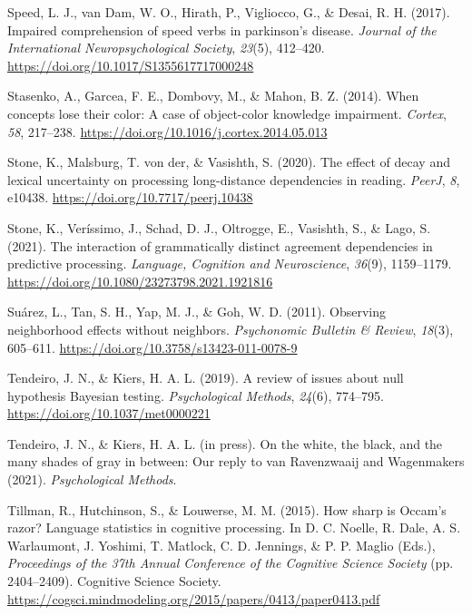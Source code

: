 \documentclass[
  12pt,
  man,floatsintext]{apa7}
\newlength{\cslhangindent}
\newlength{\cslentryspacingunit} %
\newenvironment{CSLReferences}[2] %
 {%
  \setlength{\parindent}{0pt}
  \ifodd #1
  \let\oldpar\par
  \def\par{\hangindent=\cslhangindent\oldpar}
  \fi
  \setlength{\parskip}{#2\cslentryspacingunit}
 }%
 {}
\begin{document}
\begin{CSLReferences}{1}{0}
\leavevmode{}%
Speed, L. J., van Dam, W. O., Hirath, P., Vigliocco, G., \& Desai, R. H. (2017). Impaired comprehension of speed verbs in parkinson's disease. \emph{Journal of the International Neuropsychological Society}, \emph{23}(5), 412--420. \url{https://doi.org/10.1017/S1355617717000248}

\leavevmode{}%
Stasenko, A., Garcea, F. E., Dombovy, M., \& Mahon, B. Z. (2014). When concepts lose their color: {A} case of object-color knowledge impairment. \emph{Cortex}, \emph{58}, 217--238. \url{https://doi.org/10.1016/j.cortex.2014.05.013}

\leavevmode{}%
Stone, K., Malsburg, T. von der, \& Vasishth, S. (2020). The effect of decay and lexical uncertainty on processing long-distance dependencies in reading. \emph{PeerJ}, \emph{8}, e10438. \url{https://doi.org/10.7717/peerj.10438}

\leavevmode{}%
Stone, K., Veríssimo, J., Schad, D. J., Oltrogge, E., Vasishth, S., \& Lago, S. (2021). The interaction of grammatically distinct agreement dependencies in predictive processing. \emph{Language, Cognition and Neuroscience}, \emph{36}(9), 1159--1179. \url{https://doi.org/10.1080/23273798.2021.1921816}

\leavevmode{}%
Suárez, L., Tan, S. H., Yap, M. J., \& Goh, W. D. (2011). Observing neighborhood effects without neighbors. \emph{Psychonomic Bulletin \& Review}, \emph{18}(3), 605--611. \url{https://doi.org/10.3758/s13423-011-0078-9}

\leavevmode{}%
Tendeiro, J. N., \& Kiers, H. A. L. (2019). A review of issues about null hypothesis {Bayesian} testing. \emph{Psychological Methods}, \emph{24}(6), 774--795. \url{https://doi.org/10.1037/met0000221}

\leavevmode{}%
Tendeiro, J. N., \& Kiers, H. A. L. (in press). On the white, the black, and the many shades of gray in between: {Our} reply to van {Ravenzwaaij} and {Wagenmakers} (2021). \emph{Psychological Methods}.

\leavevmode{}%
Tillman, R., Hutchinson, S., \& Louwerse, M. M. (2015). How sharp is {Occam}'s razor? {Language} statistics in cognitive processing. In D. C. Noelle, R. Dale, A. S. Warlaumont, J. Yoshimi, T. Matlock, C. D. Jennings, \& P. P. Maglio (Eds.), \emph{Proceedings of the 37th {Annual Conference} of the {Cognitive Science Society}} (pp. 2404--2409). {Cognitive Science Society}. \url{https://cogsci.mindmodeling.org/2015/papers/0413/paper0413.pdf}


\end{CSLReferences}
\end{document}
